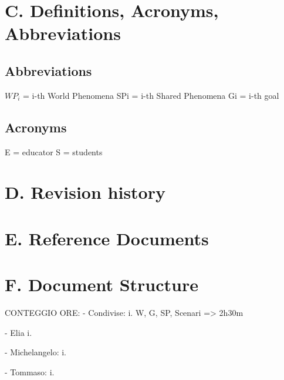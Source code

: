 \section{C. Definitions, Acronyms, Abbreviations}
    \subsection{Abbreviations}
        \(WP_i\) = i-th World Phenomena
        SPi = i-th Shared Phenomena
        Gi = i-th goal 
    \subsection{Acronyms}
        E = educator
        S = students
\section{D. Revision history}
\section{E. Reference Documents}
\section{F. Document Structure}

CONTEGGIO ORE:
- Condivise:
    i. W, G, SP, Scenari => 2h30m

- Elia
    i. 

- Michelangelo:
    i.

- Tommaso:
    i.
